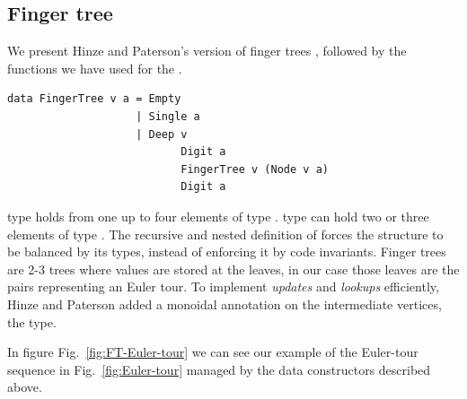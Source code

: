 \subsection{Finger tree} 

We present Hinze and Paterson's version of finger trees  \cite{FTs}, followed by the functions we have used for the .
\begin{lstlisting}
data FingerTree v a = Empty
                    | Single a 
                    | Deep v 
                           Digit a 
                           FingerTree v (Node v a) 
                           Digit a
\end{lstlisting}                           




 type holds from one up to four elements of type .  type can hold two or three elements of type . The recursive and nested definition of  forces the structure to be balanced by its types, instead of enforcing it by code invariants. Finger trees are 2-3 trees where values are stored at the leaves, in our case those leaves are the pairs representing an Euler tour. To implement \textit{updates} and \textit{lookups} efficiently, Hinze and Paterson \cite{FTs} added a monoidal annotation on the intermediate vertices, the  type.

In figure Fig.~\ref{fig:FT-Euler-tour} we can see our example of the Euler-tour sequence in Fig.~\ref{fig:Euler-tour} managed by the data constructors described above.

